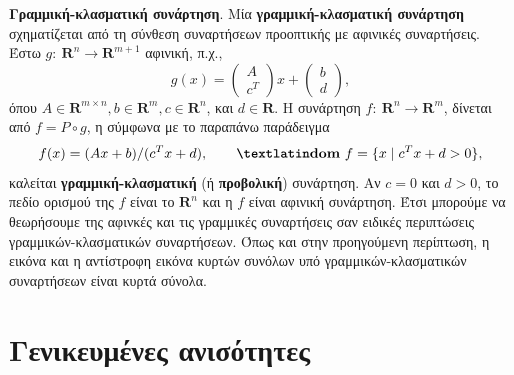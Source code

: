 \textbf{Γραμμική-κλασματική συνάρτηση}. Μία \textbf{γραμμική-κλασματική
συνάρτηση} σχηματίζεται από τη σύνθεση συναρτήσεων προοπτικής με αφινικές
συναρτήσεις. Έστω $g: \ \mathbf{R}^n \to \mathbf{R}^{m+1}$ αφινική, π.χ.,
\begin{equation*}
    g(x) = \begin{pmatrix} A \\ c^T \end{pmatrix}x + \begin{pmatrix} b \\ d
    \end{pmatrix},
\end{equation*}
όπου $A \in \mathbf{R}^{m \times n}, b \in \mathbf{R}^m, c \in \mathbf{R}^n$,
και $d \in \mathbf{R}$. Η συνάρτηση $f: \ \mathbf{R}^n \to \mathbf{R}^{m}$,
δίνεται από $f = P \circ g$, η σύμφωνα με το παραπάνω παράδειγμα
\begin{equation*}
    f(x) = (Ax + b) / (c^Tx + d), \qquad \textbf{\tl{dom}}\ f = \{x \mid c^Tx + d >
    0\},
\end{equation*}
καλείται \textbf{γραμμική-κλασματική} (ή \textbf{προβολική}) συνάρτηση. Αν $c =
0$ και $d>0$, το πεδίο ορισμού της $f$ είναι το $\mathbf{R}^n$ και η $f$ είναι
αφινική συνάρτηση. Έτσι μπορούμε να θεωρήσουμε της αφινκές και τις γραμμικές
συναρτήσεις σαν ειδικές περιπτώσεις γραμμικών-κλασματικών συναρτήσεων. Όπως και
στην προηγούμενη περίπτωση, η εικόνα και η αντίστροφη εικόνα κυρτών συνόλων υπό
γραμμικών-κλασματικών συναρτήσεων είναι κυρτά σύνολα.

\section{Γενικευμένες ανισότητες}

